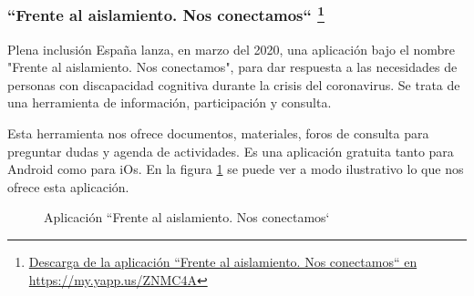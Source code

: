 \subsubsection{``Frente al aislamiento. Nos conectamos`` \footnote{\href{https://my.yapp.us/ZNMC4A}{Descarga de la aplicación ``Frente al aislamiento. Nos conectamos`` en https://my.yapp.us/ZNMC4A}}}

Plena inclusión España lanza, en marzo del 2020, una aplicación bajo el nombre "Frente al aislamiento. Nos conectamos", para dar respuesta a las necesidades de personas con discapacidad cognitiva durante la crisis del coronavirus. Se trata de una herramienta de información, participación y consulta.

Esta herramienta nos ofrece documentos, materiales, foros de consulta para preguntar dudas y agenda de actividades. Es una aplicación gratuita tanto para Android como para iOs. En la figura \ref{fig:plenaInclusion} se puede ver a modo ilustrativo lo que nos ofrece esta aplicación.


\begin{figure}[h]
	\centering
	
	\caption{Aplicación ``Frente al aislamiento. Nos conectamos`}
	\label{fig:plenaInclusion}
\end{figure} 


